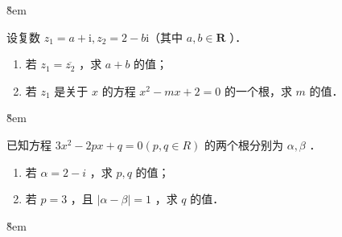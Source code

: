 \v{8em}

\begin{example}
    设复数 $z_1=a+\mathrm{i}, z_2=2-b \mathrm{i}$（其中 $a, b \in \mathbf{R}$ ）．
    \begin{enumerate}
        \item 若 $z_1=\overline{z_2}$ ，求 $a+b$ 的值；
        \item 若 $z_1$ 是关于 $x$ 的方程 $x^2-m x+2=0$ 的一个根，求 $m$ 的值．
    \end{enumerate}
\end{example}

\v{8em}

\begin{example}
    已知方程 $3 x^2-2 p x+q=0(p, q \in R)$ 的两个根分别为 $\alpha, \beta$ ．
    \begin{enumerate}
        \item 若 $\alpha=2-i$ ，求 $p, q$ 的值；
        \item 若 $p=3$ ，且 $|\alpha-\beta|=1$ ，求 $q$ 的值．
    \end{enumerate}
\end{example}

\v{8em}
